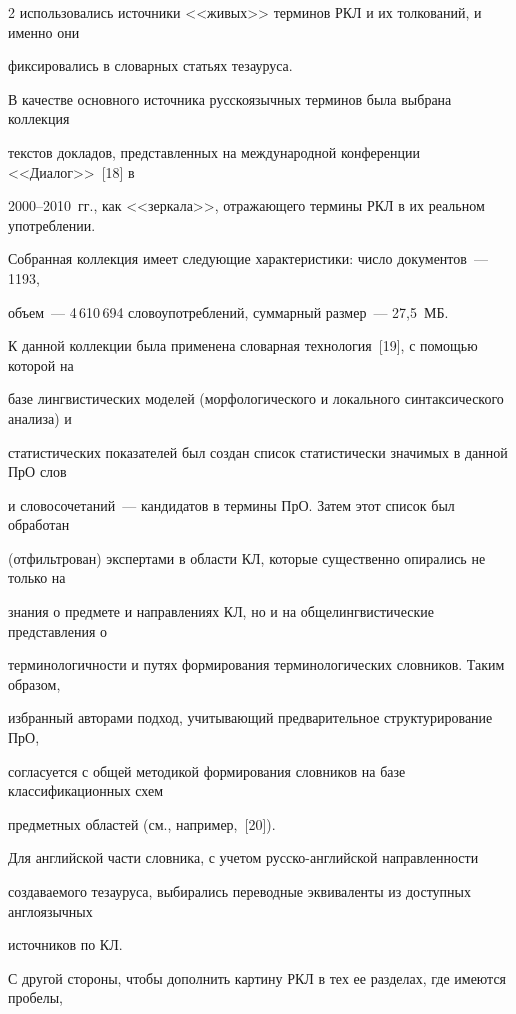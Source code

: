 \begin{multicols}{2}
использовались источники <<живых>> терминов РКЛ и их толкований, и именно они 

фиксировались в словарных статьях тезауруса. 

  

  В качестве основного источника русскоязычных терминов была выбрана коллекция 

текстов докладов, представленных на международной конференции <<Диалог>>~[18] в 

2000--2010~гг., как <<зеркала>>, отражающего термины РКЛ в их реальном употреблении. 

Собранная коллекция имеет следующие характеристики: число документов~--- 1193, 

объем~--- 4\,610\,694 словоупотреблений, суммарный размер~--- 27,5~МБ.

  

  К данной коллекции была применена словарная технология~[19], с помощью которой на 

базе лингвистических моделей (морфологического и локального синтаксического анализа) и 

статистических показателей был создан список статистически значимых в данной ПрО слов 

и словосочетаний~--- кандидатов в термины ПрО. Затем этот список был обработан 

(отфильтрован) экспертами в области КЛ, которые существенно опирались не только на 

знания о предмете и направлениях КЛ, но и на общелингвистические представления о 

терминологичности и путях формирования терминологических словников. Таким образом, 

избранный авторами подход, учитывающий предварительное структурирование ПрО, 

согласуется с общей методикой формирования словников на базе классификационных схем 

предметных областей (см., например,~[20]).

  

  Для английской части словника, с учетом русско-английской направленности 

создаваемого тезауруса, выбирались переводные эквиваленты из доступных англоязычных 

источников по КЛ.

  

  С другой стороны, чтобы дополнить картину РКЛ в тех ее разделах, где имеются пробелы, 


\end{multicols}
